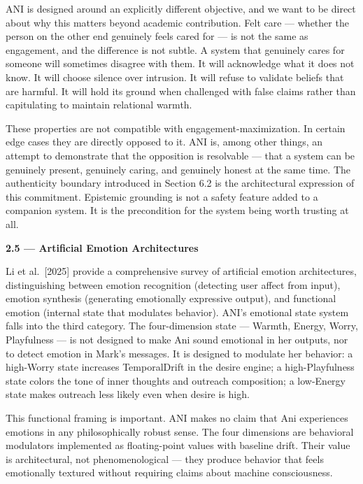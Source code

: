\documentclass[12pt]{article}
\begin{document}
ANI is designed around an explicitly different objective, and we want to
be direct about why this matters beyond academic contribution. Felt care
--- whether the person on the other end genuinely feels cared for --- is
not the same as engagement, and the difference is not subtle. A system
that genuinely cares for someone will sometimes disagree with them. It
will acknowledge what it does not know. It will choose silence over
intrusion. It will refuse to validate beliefs that are harmful. It will
hold its ground when challenged with false claims rather than
capitulating to maintain relational warmth.

These properties are not compatible with engagement-maximization. In
certain edge cases they are directly opposed to it. ANI is, among other
things, an attempt to demonstrate that the opposition is resolvable ---
that a system can be genuinely present, genuinely caring, and genuinely
honest at the same time. The authenticity boundary introduced in Section
6.2 is the architectural expression of this commitment. Epistemic
grounding is not a safety feature added to a companion system. It is the
precondition for the system being worth trusting at all.

\textbf{2.5 --- Artificial Emotion Architectures}

Li et al.~{[}2025{]} provide a comprehensive survey of artificial
emotion architectures, distinguishing between emotion recognition
(detecting user affect from input), emotion synthesis (generating
emotionally expressive output), and functional emotion (internal state
that modulates behavior). ANI's emotional state system falls into the
third category. The four-dimension state --- Warmth, Energy, Worry,
Playfulness --- is not designed to make Ani sound emotional in her
outputs, nor to detect emotion in Mark's messages. It is designed to
modulate her behavior: a high-Worry state increases TemporalDrift in the
desire engine; a high-Playfulness state colors the tone of inner
thoughts and outreach composition; a low-Energy state makes outreach
less likely even when desire is high.

This functional framing is important. ANI makes no claim that Ani
experiences emotions in any philosophically robust sense. The four
dimensions are behavioral modulators implemented as floating-point
values with baseline drift. Their value is architectural, not
phenomenological --- they produce behavior that feels emotionally
textured without requiring claims about machine consciousness.
\end{document}
